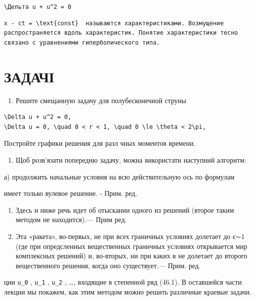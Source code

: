 \documentclass[
  ukrainian,
]{article}
\providecommand{\tightlist}{%
  \setlength{\itemsep}{0pt}\setlength{\parskip}{0pt}}
\begin{document}
\texttt{\textbackslash{}Дельта\ u\ +\ u\^{}2\ =\ 0}

\begin{verbatim}
x - ct = \text{const}  называются характеристиками. Возмущение распространяется вдоль характеристик. Понятие характеристики тесно связано с уравнениями гиперболического типа.
\end{verbatim}

\section{ЗАДАЧІ}\label{ux437ux430ux434ux430ux447ux456}

\begin{enumerate}
\def\labelenumi{\arabic{enumi}.}
\tightlist
\item
  Решите смещанную задачу для полубесконечной струны
\end{enumerate}

\begin{verbatim}
\Delta u + u^2 = 0,
\Delta u = 0, \quad 0 < r < 1, \quad 0 \le \theta < 2\pi,
\end{verbatim}

Постройте графики решения для разл чных моментов времени.

\begin{enumerate}
\def\labelenumi{\arabic{enumi}.}
\setcounter{enumi}{1}
\tightlist
\item
  Щоб розв'язати попередню задачу, можна використати наступний алгоритм:
\end{enumerate}

а) продолжить начальные условия на всю действительную ось по формулам

имеет только вулевое решение. - Прим. ред.

\begin{enumerate}
\def\labelenumi{\arabic{enumi})}
\setcounter{enumi}{1}
\item
  Здесь и ниже речь идет об отыскании одного из решений (второе таким
  методом не находится).--- Прим ред.
\item
  Эта «ракета», во-первых, не при всех граничных условиях долетает до
  є=1 (где при опредсленных вещественных граничных условиях открывается
  мир комплексных решений) и, во-вторых, ни при каких в не долетает до
  второго вещественного решения, когда оно существует.--- Прим. ред.
\end{enumerate}

ции \texttt{u\_0} , \texttt{u\_1} , \texttt{u\_2} , \ldots, входящие в
степенной ряд (46.1). В оставшейся части лекции мы покажем, как этим
методом можно решить различные краевые задачи.
\end{document}
